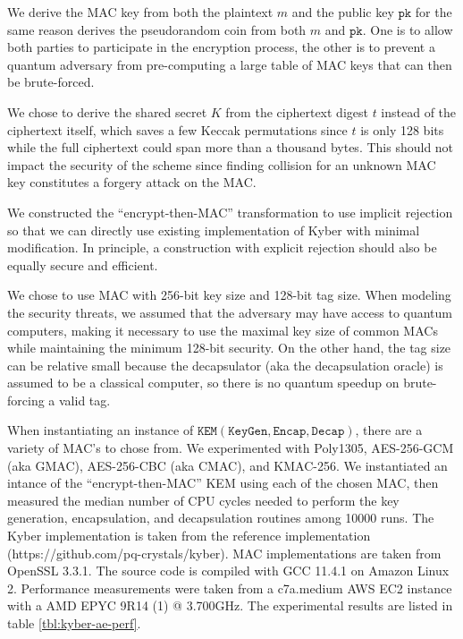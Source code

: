 \documentclass[floatrow,journal=tches,submission]{iacrtrans}
\newcommand{\keygen}{\texttt{KeyGen}}
\newcommand{\kem}{\texttt{KEM}}
\newcommand{\encap}{\texttt{Encap}}
\newcommand{\decap}{\texttt{Decap}}
\newcommand{\pk}{\texttt{pk}}
\begin{document}
\begin{remark}
    We derive the MAC key from both the plaintext $m$ and the public key $\pk$ for the same reason \cite{avanzi2019crystals} derives the pseudorandom coin from both $m$ and $\pk$. One is to allow both parties to participate in the encryption process, the other is to prevent a quantum adversary from pre-computing a large table of MAC keys that can then be brute-forced.
\end{remark}
\begin{remark}
    We chose to derive the shared secret $K$ from the ciphertext digest $t$ instead of the ciphertext itself, which saves a few Keccak permutations since $t$ is only 128 bits while the full ciphertext could span more than a thousand bytes. This should not impact the security of the scheme since finding collision for an unknown MAC key constitutes a forgery attack on the MAC.
\end{remark}
\begin{remark}
    We constructed the ``encrypt-then-MAC'' transformation to use implicit rejection so that we can directly use existing implementation of Kyber with minimal modification. In principle, a construction with explicit rejection should also be equally secure and efficient.
\end{remark}
\begin{remark}
    We chose to use MAC with 256-bit key size and 128-bit tag size. When modeling the security threats, we assumed that the adversary may have access to quantum computers, making it necessary to use the maximal key size of common MACs while maintaining the minimum 128-bit security. On the other hand, the tag size can be relative small because the decapsulator (aka the decapsulation oracle) is assumed to be a classical computer, so there is no quantum speedup on brute-forcing a valid tag.
\end{remark}

When instantiating an instance of $\kem(\keygen, \encap, \decap)$, there are a variety of MAC's to chose from. We experimented with Poly1305, AES-256-GCM (aka GMAC), AES-256-CBC (aka CMAC), and KMAC-256. We instantiated an intance of the ``encrypt-then-MAC'' KEM using each of the chosen MAC, then measured the median number of CPU cycles needed to perform the key generation, encapsulation, and decapsulation routines among 10000 runs. The Kyber implementation is taken from the reference implementation (https://github.com/pq-crystals/kyber). MAC implementations are taken from OpenSSL 3.3.1. The source code is compiled with GCC 11.4.1 on Amazon Linux 2. Performance measurements were taken from a c7a.medium AWS EC2 instance with a AMD EPYC 9R14 (1) @ 3.700GHz. The experimental results are listed in table \ref{tbl:kyber-ae-perf}.
\end{document}
